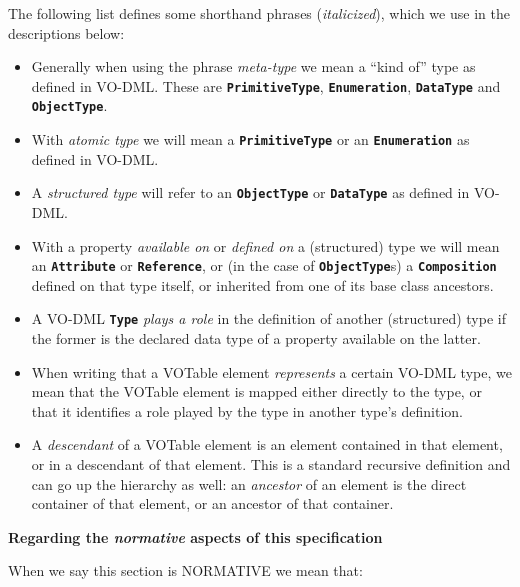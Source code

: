 \documentclass[11pt,a4paper]{ivoa}
\begin{document}
The following list defines some shorthand phrases (\emph{italicized}),
which we use in the descriptions below:

\begin{itemize}
\item
  Generally when using the phrase \emph{meta-type} we mean a ``kind of''
  type as defined in VO-DML. These are \textbf{\texttt{PrimitiveType}},
  \textbf{\texttt{Enumeration}}, \textbf{\texttt{DataType}} and
  \textbf{\texttt{ObjectType}}.
\item
  With \emph{atomic type} we will mean a \textbf{\texttt{PrimitiveType}}
  or an \textbf{\texttt{Enumeration}} as defined in VO-DML.
\item
  A \emph{structured type} will refer to an \textbf{\texttt{ObjectType}}
  or \textbf{\texttt{DataType}} as defined in VO-DML.
\item
  With a property \emph{available on} or \emph{defined on} a
  (structured) type we will mean an \textbf{\texttt{Attribute}} or
  \textbf{\texttt{Reference}}, or (in the case of
  \textbf{\texttt{ObjectType}}s) a \textbf{\texttt{Composition}} defined
  on that type itself, or inherited from one of its base class
  ancestors.
\item
  A VO-DML \textbf{\texttt{Type}} \emph{plays a role} in the definition
  of another (structured) type if the former is the declared data type
  of a property available on the latter.
\item
  When writing that a VOTable element \emph{represents} a certain VO-DML
  type, we mean that the VOTable element is mapped either directly to
  the type, or that it identifies a role played by the type in another
  type's definition.
\item
  A \emph{descendant} of a VOTable element is an element contained in
  that element, or in a descendant of that element. This is a standard
  recursive definition and can go up the hierarchy as well: an
  \emph{ancestor} of an element is the direct container of that element,
  or an ancestor of that container.
\end{itemize}

\textbf{Regarding the \emph{normative} aspects of this specification}

When we say this section is NORMATIVE we mean that:
\end{document}
